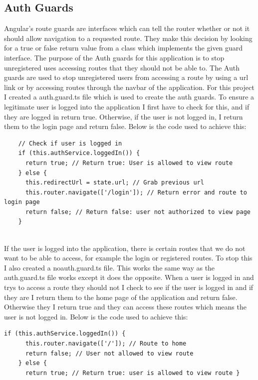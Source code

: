 \subsection{Auth Guards}
Angular’s route guards are interfaces which can tell the router whether or not it should allow navigation to a requested route. They make this decision by looking for a true or false return value from a class which implements the given guard interface\cite{AngularA58}. The purpose of the Auth guards for this application is to stop unregistered uses accessing routes that they should not be able to. The Auth guards are used to stop unregistered users from accessing a route by using a url link or by accessing routes through the navbar of the application. For this project I created a auth.guard.ts file which is used to create the auth guards. To ensure a legitimate user is logged into the application I first have to check for this, and if they are logged in return true. Otherwise, if the user is not logged in, I return them to the login page and return false. Below is the code used to achieve this:

\begin{lstlisting}
    // Check if user is logged in
    if (this.authService.loggedIn()) {
      return true; // Return true: User is allowed to view route
    } else {
      this.redirectUrl = state.url; // Grab previous url
      this.router.navigate(['/login']); // Return error and route to login page
      return false; // Return false: user not authorized to view page
    }
  
\end{lstlisting}
If the user is logged into the application, there is certain routes that we do not want to be able to access, for example the login or registered routes. To stop this I also created a noauth.guard.ts file. This works the same way as the auth.guard.ts file works except it does the opposite. When a user is logged in and trys to access a route they should not I check to see if the user is logged in and if they are I return them to the home page of the application and return false. Otherwise they I return true and they can access these routes which means the user is not logged in. Below is the code used to achieve this:

\begin{lstlisting}
if (this.authService.loggedIn()) {
      this.router.navigate(['/']); // Route to home
      return false; // User not allowed to view route
    } else {
      return true; // Return true: user is allowed to view route }
\end{lstlisting}

